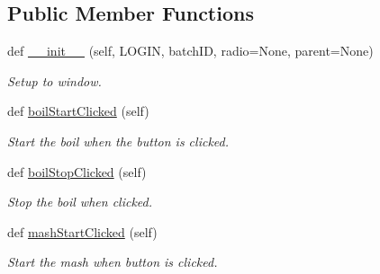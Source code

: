 \subsection*{Public Member Functions}
\begin{DoxyCompactItemize}
\item 
\mbox{\label{classboil_mash_monitor_1_1_monitor_window_a4ba4b0a9e71e0f68406c92c75bfe17b3}} 
def \mbox{\hyperlink{classboil_mash_monitor_1_1_monitor_window_a4ba4b0a9e71e0f68406c92c75bfe17b3}{\+\_\+\+\_\+init\+\_\+\+\_\+}} (self, L\+O\+G\+IN, batch\+ID, radio=None, parent=None)
\begin{DoxyCompactList}\small\item\em Setup to window. \end{DoxyCompactList}\item 
\mbox{\label{classboil_mash_monitor_1_1_monitor_window_a80cfb73c8f564b89c116da5920664866}} 
def \mbox{\hyperlink{classboil_mash_monitor_1_1_monitor_window_a80cfb73c8f564b89c116da5920664866}{boil\+Start\+Clicked}} (self)
\begin{DoxyCompactList}\small\item\em Start the boil when the button is clicked. \end{DoxyCompactList}\item 
\mbox{\label{classboil_mash_monitor_1_1_monitor_window_a103a2f27324e1cc8476e2ae148e74dbf}} 
def \mbox{\hyperlink{classboil_mash_monitor_1_1_monitor_window_a103a2f27324e1cc8476e2ae148e74dbf}{boil\+Stop\+Clicked}} (self)
\begin{DoxyCompactList}\small\item\em Stop the boil when clicked. \end{DoxyCompactList}\item 
\mbox{\label{classboil_mash_monitor_1_1_monitor_window_a83bdbea370518800dbbd91bf36a9eab5}} 
def \mbox{\hyperlink{classboil_mash_monitor_1_1_monitor_window_a83bdbea370518800dbbd91bf36a9eab5}{mash\+Start\+Clicked}} (self)
\begin{DoxyCompactList}\small\item\em Start the mash when button is clicked. \end{DoxyCompactList}\item 

\end{DoxyCompactItemize}
